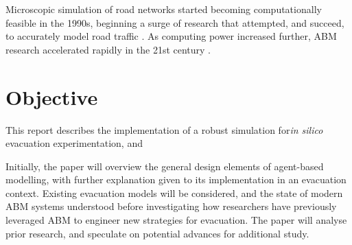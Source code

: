 Microscopic simulation of road networks started becoming computationally feasible in the 1990s, beginning a surge of research that attempted, and succeed, to accurately model road traffic \cite{Nagel1992ATraffic}. As computing power increased further, ABM research accelerated rapidly in the 21st century \cite{Bonabeau2002Agent-basedSystems.,Teodorovic2003TransportApproach}.

\section{Objective}
This report describes the implementation of a robust simulation for\textit{in silico} evacuation experimentation, and

Initially, the paper will overview the general design elements of agent-based modelling, with further explanation given to its implementation in an evacuation context. Existing evacuation models will be considered, and the state of modern ABM systems understood before investigating how researchers have previously leveraged ABM to engineer new strategies for evacuation. The paper will analyse prior research, and speculate on potential advances for additional study. 